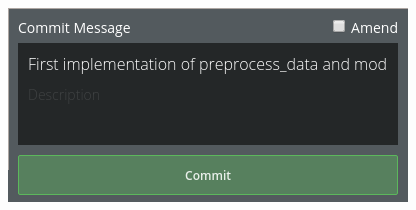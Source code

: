\begin{frame}
\begin{columns}
\begin{column}{0.6\textwidth}
\begin{figure}
\begin{overprint}
					\includegraphics[width=\textwidth]{./pictures/kraken_commit.png}
				\end{overprint}
			\end{figure}
		\end{column}
	\end{columns}
\end{frame}
